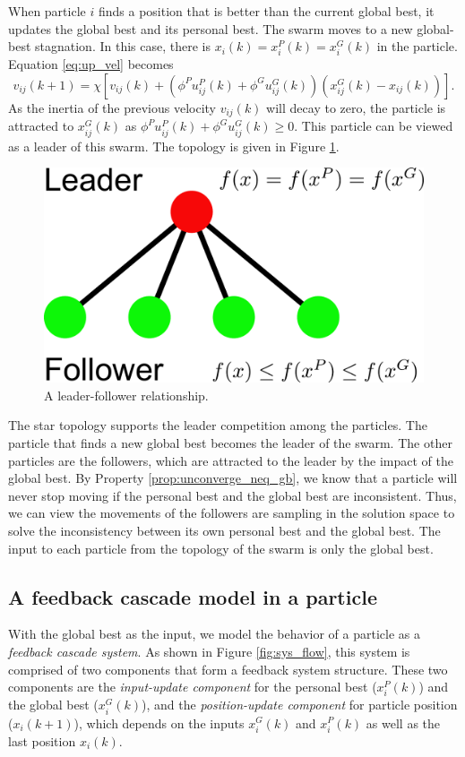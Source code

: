 When particle $ i $ finds a position that is better than the current global best, it updates the global best and its personal best.
The swarm moves to a new global-best stagnation.
In this case, there is $ x_{i}(k) = x_{i}^{P}(k) = x_{i}^{G}(k) $ in the particle.
Equation \eqref{eq:up_vel} becomes
\begin{equation}
\label{eq:up_vel:leader}
v_{ij}(k+1) = \chi [ v_{ij}(k) 
 +( \phi^{P} u^{P}_{ij}(k) + \phi^{G} u^{G}_{ij}(k) ) (x^{G}_{ij}(k) - x_{ij}(k))  ].
\end{equation}
As the inertia of the previous velocity $ v_{ij}(k) $ will decay to zero,
the particle is attracted to $ x^{G}_{ij}(k) $ as $ \phi^{P} u^{P}_{ij}(k) + \phi^{G} u^{G}_{ij}(k) \geq 0 $.
This particle can be viewed as a leader of this swarm.
The topology is given in Figure \ref{fig:leader_follower}.
\begin{figure}[tbph]
\centering
\includegraphics[width=0.5\linewidth]{./fig/leader_follower}
\caption{A leader-follower relationship.}
\label{fig:leader_follower}
\end{figure}

The star topology supports the leader competition among the particles.
The particle that finds a new global best becomes the leader of the swarm.
The other particles are the followers, which are attracted to the leader by the impact of the global best.
By Property \ref{prop:unconverge_neq_gb}, we know that a particle will never stop moving if the personal best and the global best are inconsistent.
Thus, we can view the movements of the followers are sampling in the solution space to solve the inconsistency between its own personal best and the global best.
The input to each particle from the topology of the swarm is only the global best.

\subsection{A feedback cascade model in a particle}

With the global best as the input, we model the behavior of a particle as a \emph{feedback cascade system}.
As shown in Figure \ref{fig:sys_flow}, this system is comprised of two components that form a feedback system structure.
These two components are 
the \emph{input-update component} for the personal best ($ x^{P}_{i}(k) $) and the global best ($ x^{G}_{i}(k) $), 
and the \emph{position-update component} for particle position ($ x_{i}(k+1) $), which depends on the inputs $ x^{G}_{i}(k) $ and $ x^{P}_{i}(k) $ as well as the last position $ x_{i}(k) $.

